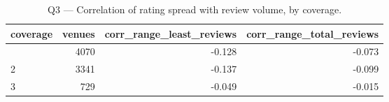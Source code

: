 \begin{table}[ht]
\centering
\caption{Q3 — Correlation of rating spread with review volume, by coverage.}
\label{tab:q3_correlations}
{\tiny
\begin{tabular}{lrrr}
\toprule
coverage & venues & corr\_range\_least\_reviews & corr\_range\_total\_reviews \\
\midrule
 & 4070 & -0.128 & -0.073 \\
2 & 3341 & -0.137 & -0.099 \\
3 & 729 & -0.049 & -0.015 \\
\bottomrule
\end{tabular}
}
\end{table}
